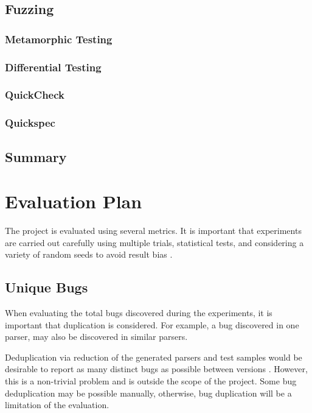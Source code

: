\documentclass{article}
\begin{document}
\subsection{Fuzzing}
\subsubsection{Metamorphic Testing}
\subsubsection{Differential Testing}
\subsubsection{QuickCheck}
\subsubsection{Quickspec}

\subsection{Summary}

\section{Evaluation Plan} %

The project is evaluated using several metrics. It is important that experiments are carried out carefully using multiple trials, statistical tests, and considering a variety of random seeds to avoid result bias \cite{evaluation}.

\subsection{Unique Bugs}

When evaluating the total bugs discovered during the experiments, it is important that duplication is considered. For example, a bug discovered in one parser, may also be discovered in similar parsers.

Deduplication via reduction of the generated parsers and test samples would be desirable to report as many distinct bugs as possible between versions \cite{deduplication}. However, this is a non-trivial problem and is outside the scope of the project. Some bug deduplication may be possible manually, otherwise, bug duplication will be a limitation of the evaluation.
\end{document}
